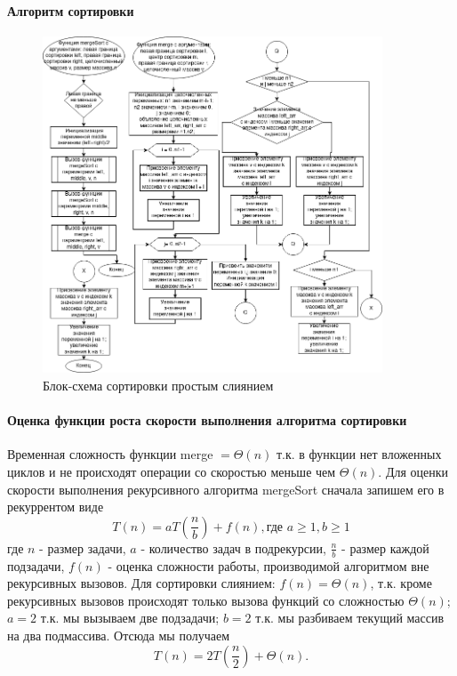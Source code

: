 \documentclass[a4paper, 14pt]{extarticle}
\begin{document}
\paragraph{Алгоритм сортировки}
\begin{figure}[htpb]
  \centering
  \includegraphics[width=0.9\textwidth]{pictures/third_sort_flowchart.png}
  \caption{Блок-схема сортировки простым слиянием}
  \label{fig:third_sort_flow}
\end{figure}

\paragraph{Оценка функции роста скорости выполнения алгоритма сортировки}
Временная сложность функции merge $ = \Theta(n)$ т.к. в функции нет вложенных
циклов и не происходят операции со скоростью меньше чем  $\Theta(n)$. 
Для оценки скорости выполнения рекурсивного алгоритма mergeSort сначала запишем
его в рекуррентом виде
\begin{equation}
T(n)=aT(\frac{n}{b})+f(n), \text{где } a\geq 1, b\geq 1
\end{equation}
где $n$ - размер задачи,  $a$ -  количество задач в подрекурсии,
$\frac{n}{b}$ - размер каждой подзадачи, $f(n)$ - оценка сложности работы,
производимой алгоритмом вне рекурсивных вызовов.
Для сортировки слиянием: $f(n) = \Theta(n)$, т.к. кроме рекурсивных вызовов происходят
только вызова функций со сложностью  $\Theta(n)$; $a = 2$ т.к. мы
вызываем две подзадачи; $b = 2$ т.к. мы разбиваем текущий массив на два подмассива.
Отсюда мы получаем \[
  T(n) = 2T(\frac{n}{2})+\Theta(n)
.\] 
\end{document}
